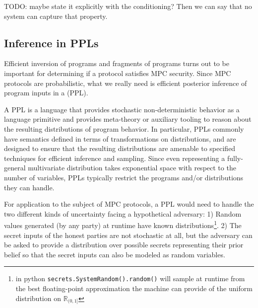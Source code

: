 \documentclass[compsoc, conference, a4paper, 10pt, times]{IEEEtran}
\begin{document}
TODO: maybe state it explicitly with the conditioning? Then we can say that no system can capture that property.

\subsection{Inference in PPLs}

Efficient inversion of programs and fragments of programs turns out to be important for determining if a protocol satisfies MPC security.
Since MPC protocols are probabilistic, what we really need is efficient posterior inference of program inputs in a
 (PPL).

A PPL is a language that provides stochastic non-deterministic behavior as a language primitive
and provides meta-theory or auxiliary tooling to reason about the resulting distributions of program behavior.
In particular, PPLs commonly have semantics defined in terms of transformations on distributions,
and are designed to ensure that the resulting distributions are amenable to specified techniques for efficient
inference and sampling. Since even representing a fully-general multivariate distribution takes exponential space with respect to the number of variables,
PPLs typically restrict the programs and/or distributions they can handle.

For application to the subject of MPC protocols, a PPL would need to handle the two different kinds of uncertainty facing a hypothetical adversary:
1) Random values generated (by any party) at runtime have known distributions\footnote{
    \eg{} in python \texttt{secrets.SystemRandom().random()}
    will sample at runtime from the best floating-point approximation the machine can provide
    of the uniform distribution on $\mathbb{R}_{(0,1]}$
}.
2) The secret inputs of the honest parties are not stochastic at all, but the adversary can be asked to provide a distribution over
possible secrets representing their prior belief so that the secret inputs can also be modeled as random variables.
\end{document}
